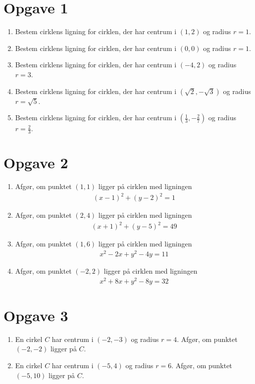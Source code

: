 \section*{Opgave 1}

\begin{enumerate}[label=\roman*)]
	\item Bestem cirklens ligning for cirklen, der har centrum i $(1,2)$
	 og radius $r = 1$.
	\item Bestem cirklens ligning for cirklen, der har centrum i $(0,0)$
	og radius $r = 1$.
	\item Bestem cirklens ligning for cirklen, der har centrum i $(-4,2)$
	og radius $r = 3$.
	\item Bestem cirklens ligning for cirklen, der har centrum i $(\sqrt{2},-\sqrt{3})$
	og radius $r = \sqrt{5}$.
	\item Bestem cirklens ligning for cirklen, der har centrum i $(\frac{1}{3},-\frac{2}{7})$
	og radius $r = \frac{2}{3}$.
\end{enumerate}

\section*{Opgave 2}

\begin{enumerate}[label=\roman*)]
	\item Afgør, om punktet $(1,1)$ ligger på cirklen med ligningen
	\begin{align*}
		(x-1)^2 +(y-2)^2 = 1 
	\end{align*}
	\item Afgør, om punktet $(2,4)$ ligger på cirklen med ligningen
	\begin{align*}
		(x+1)^2 + (y-5)^2 = 49
	\end{align*}
	\item Afgør, om punktet $(1,6)$ ligger på cirklen med ligningen 
	\begin{align*}
		x^2-2x+y^2-4y=11
	\end{align*}
	\item Afgør, om punktet $(-2,2)$ ligger på cirklen med ligningen
	\begin{align*}
		x^2+8x+y^2-8y=32
	\end{align*}
\end{enumerate}

\section*{Opgave 3}
\begin{enumerate}[label=\roman*)]
	\item En cirkel $C$ har centrum i $(-2,-3)$ og radius $r=4$. Afgør, om punktet $(-2,-2)$ 
	ligger på $C$.
	\item En cirkel $C$ har centrum i $(-5,4)$ og radius $r=6$. Afgør, om punktet $(-5,10)$ 
	ligger på $C$.
\end{enumerate}

